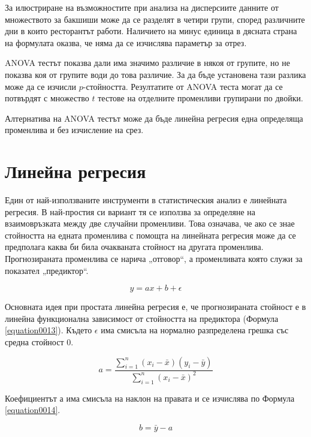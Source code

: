 За илюстриране на възможностите при анализа на дисперсиите данните от множеството за бакшиши може да се разделят в четири групи, според различните дни в които ресторантът работи. Наличието на минус единица в дясната страна на формулата оказва, че няма да се изчислява параметър за отрез. 

ANOVA тестът показва дали има значимо различие в някоя от групите, но не показва коя от групите води до това различие. За да бъде установена тази разлика може да се изчисли $p$-стойността. Резултатите от ANOVA теста могат да се потвърдят с множество $t$ тестове на отделните променливи групирани по двойки. 

Алтернатива на ANOVA тестът може да бъде линейна регресия една определяща променлива и без изчисление на срез. 

\section{Линейна регресия}

Един от най-използваните инструменти в статистическия анализ е линейната регресия. В най-простия си вариант тя се използва за определяне на взаимовръзката между две случайни променливи. Това означава, че ако се знае стойността на едната променлива с помощта на линейната регресия може да се предполага каква би била очакваната стойност на другата променлива. Прогнозираната променлива се нарича „отговор“, а променливата която служи за показател „предиктор“. 

\begin{equation}
y = ax + b + \epsilon
\label{equation0013}
\end{equation}

Основната идея при простата линейна регресия е, че прогнозираната стойност е в линейна функционална зависимост от стойността на предиктора (Формула \ref{equation0013}). Където $\epsilon$ има смисъла на нормално разпределена грешка със средна стойност 0.

\begin{equation}
\label{equation0014}
a = \frac{ \sum_{i=1}^{n}(x_i-\bar{x})(y_i-\bar{y}) }{ \sum_{i=1}^{n}(x_i-\bar{x})^2 }
\end{equation}

Коефициентът $а$ има смисъла на наклон на правата и се изчислява по Формула \ref{equation0014}.

\begin{equation}
b = \bar{y} - a
\label{equation0015}
\end{equation}

